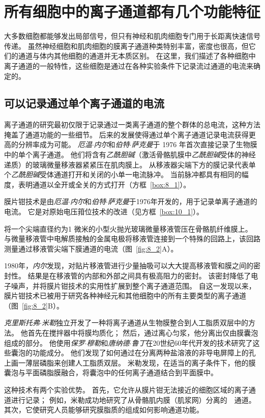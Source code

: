 \section{所有细胞中的离子通道都有几个功能特征}

大多数细胞都能够发出局部信号，但只有神经和肌肉细胞专门用于长距离快速信号传递。
虽然神经细胞和肌肉细胞的膜离子通道种类特别丰富，密度也很高，但它们的通道与体内其他细胞的通道并无本质区别。
在这里，我们描述了各种细胞中离子通道的一般特性，这些细胞是通过在各种实验条件下记录流过通道的电流来确定的。



\subsection{可以记录通过单个离子通道的电流}

离子通道的研究最初仅限于记录通过一类离子通道的整个群体的总电流，这种方法掩盖了通道功能的一些细节。
后来的发展使得通过单个离子通道记录电流获得更高的分辨率成为可能。
\textit{厄温$\cdot$内尔}和\textit{伯特$\cdot$萨克曼}于 1976 年首次直接记录了生物膜中的单个离子通道。
他们将含有\textit{乙酰胆碱}（激活骨骼肌膜中\textit{乙酰胆碱}受体的神经递质）的玻璃微量移液器紧紧压在肌肉膜上。
从移液器尖端下方的膜记录代表单个\textit{乙酰胆碱}受体通道打开和关闭的小单一电流脉冲。
当前脉冲都具有相同的幅度，表明通道以全开或全关的方式打开（方框~\ref{box:8_1}）。


\begin{proposition} \label{box:8_1}
	
	\quad \quad 膜片钳技术是由\textit{厄温$\cdot$内尔}和\textit{伯特$\cdot$萨克曼}于1976年开发的，用于记录单离子通道的电流。
	它是对原始电压箝位技术的改进（见方框~\ref{box:10_1}）。
	
	\quad \quad 将一个尖端直径约为1 微米的小型火抛光玻璃微量移液管压在骨骼肌纤维膜上。
	与微量移液管中电解质接触的金属电极将移液管连接到一个特殊的回路上，该回路测量通过移液管尖端下膜通道的电流（图~\ref{fig:8_2}A）。
	
	\quad \quad 1980年，\textit{内尔}发现，对贴片移液管进行少量抽吸可以大大提高移液管和膜之间的密封性。
	结果是在移液管的内部和外部之间具有极高阻力的密封。
	该密封降低了电子噪声，并将膜片钳技术的实用性扩展到整个离子通道范围。
	自这一发现以来，膜片钳技术已被用于研究各种神经元和其他细胞中的所有主要类型的离子通道（图~\ref{fig:8_2}B）。
	
	\quad \quad \textit{克里斯托弗$\cdot$米勒}独立开发了一种将离子通道从生物膜整合到人工脂质双层中的方法。
	他首先在搅拌器中将膜均质化；
	然后，通过离心匀浆，他分离出仅由膜囊泡组成的部分。
	他使用\textit{保罗$\cdot$穆勒}和\textit{唐纳德$\cdot$鲁丁}在20世纪60年代开发的技术研究了这些囊泡的功能成分。
	他们发现了如何通过在分离两种盐溶液的非导电屏障上的孔上画一薄层磷脂来创建人工脂质双层。
	米勒发现，在适当的离子条件下，他的膜囊泡与平面磷脂膜融合，将囊泡中的任何离子通道结合到平面膜中。
	
	\quad \quad 这种技术有两个实验优势。
	首先，它允许从膜片钳无法接近的细胞区域的离子通道进行记录；
	例如，米勒成功地研究了从骨骼肌内膜（肌浆网）分离的~~通道。
	其次，它使研究人员能够研究膜脂质的组成如何影响通道功能。
	
\end{proposition}


